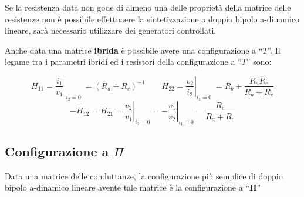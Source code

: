 \documentclass[a4paper]{report}
\begin{document}
Se la resistenza data non gode di almeno una delle propriet\`a della
matrice delle resistenze non \`e possibile effettuaere la
sintetizzazione a doppio bipolo a-dinamico lineare, sar\`a necessario
utilizzare dei generatori controllati.

Anche data una matrice {\bf ibrida} \`e possibile avere una
configurazione a ``$T$''. Il legame tra i parametri ibridi ed i
resistori della configurazione a ``$T$'' sono:

\[
H_{11}=\left.
\dfrac{i_1}{v_1}\right|_{i_2=0} \ = (R_a+R_c)^{-1} \quad \quad
H_{22}=\left.
\dfrac{v_2}{i_2}\right|_{i_1=0} \ = R_b + \dfrac{R_aR_c}{R_a+R_c}
\]
\vspace{0.5cm}
\[
-H_{12}=H_{21}=
\left.\dfrac{v_2}{v_1}\right|_{i_2=0}=
\left.-\dfrac{v_1}{v_2}\right|_{i_1=0}=
\dfrac{R_c}{R_a+R_c}
\]

\subsection{Configurazione a $\Pi$}
Data una matrice delle conduttanze, la configurazione pi\`u semplice
di doppio bipolo a-dinamico lineare avente tale matrice \`e la
configurazione a ``$\mathbf{\Pi}$''
\end{document}
